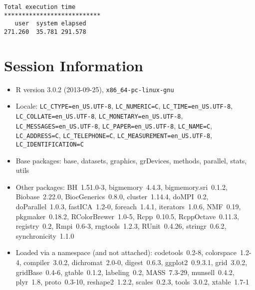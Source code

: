 \documentclass[10pt]{article}\usepackage[]{graphicx}\usepackage[]{color}
\begin{document}
\begin{verbatim}
Total execution time
***************************
   user  system elapsed 
271.260  35.781 291.578 

\end{verbatim}

\section*{Session Information}
\begin{itemize}\raggedright
  \item R version 3.0.2 (2013-09-25), \verb|x86_64-pc-linux-gnu|
  \item Locale: \verb|LC_CTYPE=en_US.UTF-8|, \verb|LC_NUMERIC=C|, \verb|LC_TIME=en_US.UTF-8|, \verb|LC_COLLATE=en_US.UTF-8|, \verb|LC_MONETARY=en_US.UTF-8|, \verb|LC_MESSAGES=en_US.UTF-8|, \verb|LC_PAPER=en_US.UTF-8|, \verb|LC_NAME=C|, \verb|LC_ADDRESS=C|, \verb|LC_TELEPHONE=C|, \verb|LC_MEASUREMENT=en_US.UTF-8|, \verb|LC_IDENTIFICATION=C|
  \item Base packages: base, datasets, graphics, grDevices, methods,
    parallel, stats, utils
  \item Other packages: BH~1.51.0-3, bigmemory~4.4.3,
    bigmemory.sri~0.1.2, Biobase~2.22.0, BiocGenerics~0.8.0,
    cluster~1.14.4, doMPI~0.2, doParallel~1.0.3, fastICA~1.2-0,
    foreach~1.4.1, iterators~1.0.6, NMF~0.19, pkgmaker~0.18.2,
    RColorBrewer~1.0-5, Rcpp~0.10.5, RcppOctave~0.11.3, registry~0.2,
    Rmpi~0.6-3, rngtools~1.2.3, RUnit~0.4.26, stringr~0.6.2,
    synchronicity~1.1.0
  \item Loaded via a namespace (and not attached): codetools~0.2-8,
    colorspace~1.2-4, compiler~3.0.2, dichromat~2.0-0, digest~0.6.3,
    ggplot2~0.9.3.1, grid~3.0.2, gridBase~0.4-6, gtable~0.1.2,
    labeling~0.2, MASS~7.3-29, munsell~0.4.2, plyr~1.8, proto~0.3-10,
    reshape2~1.2.2, scales~0.2.3, tools~3.0.2, xtable~1.7-1
\end{itemize}
\end{document}

